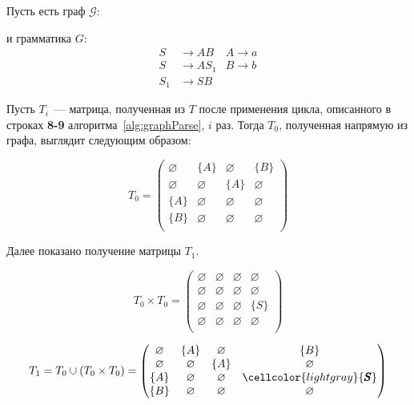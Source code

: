 \begin{example}

Пусть есть граф $\mathcal{G}$:
\begin{center}
  
\end{center}

и грамматика $G$:
\begin{align*}
S   &\to A B    &A  \to a \\
S  &\to A S_1   &B  \to b\\
S_1 &\to S B
\end{align*}


Пусть $T_i$~--- матрица, полученная из $T$ после применения цикла, описанного в строках \textbf{8-9} алгоритма~\ref{alg:graphParse}, $i$ раз.
Тогда $T_0$, полученная напрямую из графа, выглядит следующим образом:

\[
T_0 = \begin{pmatrix}
    \varnothing & \{A\}       & \varnothing & \{B\}       \\
    \varnothing & \varnothing & \{A\}       & \varnothing \\
    \{A\}       & \varnothing & \varnothing & \varnothing \\
    \{B\}       & \varnothing & \varnothing & \varnothing \\
\end{pmatrix}
\]

Далее показано получение матрицы $T_1$.

\[
T_0 \times T_0 = \begin{pmatrix}
    \varnothing & \varnothing & \varnothing & \varnothing \\
    \varnothing & \varnothing & \varnothing & \varnothing \\
    \varnothing & \varnothing & \varnothing & \{S\}       \\
    \varnothing & \varnothing & \varnothing & \varnothing \\
\end{pmatrix}
\]

\[
T_1 = T_0 \cup (T_0 \times T_0) = \begin{pmatrix}
    \varnothing & \{A\}       & \varnothing & \{B\}       \\
    \varnothing & \varnothing & \{A\}       & \varnothing \\
    \{A\}       & \varnothing & \varnothing & \cellcolor{lightgray} \{\pmb{S}\}       \\
    \{B\}       & \varnothing & \varnothing & \varnothing \\
\end{pmatrix}
\]


\end{example}
